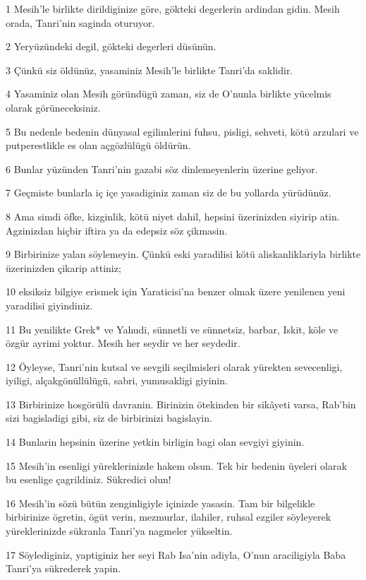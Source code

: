 \par 1 Mesih'le birlikte dirildiginize göre, gökteki degerlerin ardindan gidin. Mesih orada, Tanri'nin saginda oturuyor.
\par 2 Yeryüzündeki degil, gökteki degerleri düsünün.
\par 3 Çünkü siz öldünüz, yasaminiz Mesih'le birlikte Tanri'da saklidir.
\par 4 Yasaminiz olan Mesih göründügü zaman, siz de O'nunla birlikte yücelmis olarak görüneceksiniz.
\par 5 Bu nedenle bedenin dünyasal egilimlerini fuhsu, pisligi, sehveti, kötü arzulari ve putperestlikle es olan açgözlülügü öldürün.
\par 6 Bunlar yüzünden Tanri'nin gazabi söz dinlemeyenlerin üzerine geliyor.
\par 7 Geçmiste bunlarla iç içe yasadiginiz zaman siz de bu yollarda yürüdünüz.
\par 8 Ama simdi öfke, kizginlik, kötü niyet dahil, hepsini üzerinizden siyirip atin. Agzinizdan hiçbir iftira ya da edepsiz söz çikmasin.
\par 9 Birbirinize yalan söylemeyin. Çünkü eski yaradilisi kötü aliskanliklariyla birlikte üzerinizden çikarip attiniz;
\par 10 eksiksiz bilgiye erismek için Yaraticisi'na benzer olmak üzere yenilenen yeni yaradilisi giyindiniz.
\par 11 Bu yenilikte Grek* ve Yahudi, sünnetli ve sünnetsiz, barbar, Iskit, köle ve özgür ayrimi yoktur. Mesih her seydir ve her seydedir.
\par 12 Öyleyse, Tanri'nin kutsal ve sevgili seçilmisleri olarak yürekten sevecenligi, iyiligi, alçakgönüllülügü, sabri, yumusakligi giyinin.
\par 13 Birbirinize hosgörülü davranin. Birinizin ötekinden bir sikâyeti varsa, Rab'bin sizi bagisladigi gibi, siz de birbirinizi bagislayin.
\par 14 Bunlarin hepsinin üzerine yetkin birligin bagi olan sevgiyi giyinin.
\par 15 Mesih'in esenligi yüreklerinizde hakem olsun. Tek bir bedenin üyeleri olarak bu esenlige çagrildiniz. Sükredici olun!
\par 16 Mesih'in sözü bütün zenginligiyle içinizde yasasin. Tam bir bilgelikle birbirinize ögretin, ögüt verin, mezmurlar, ilahiler, ruhsal ezgiler söyleyerek yüreklerinizde sükranla Tanri'ya nagmeler yükseltin.
\par 17 Söylediginiz, yaptiginiz her seyi Rab Isa'nin adiyla, O'nun araciligiyla Baba Tanri'ya sükrederek yapin.

